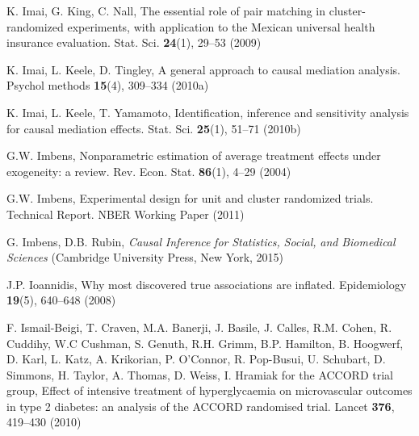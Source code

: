 \begin{list}{}{\setlength{\leftmargin}{2.1em}\setlength{\labelwidth}{0pt}
  \setlength{\labelsep}{0pt}\setlength{\itemindent}{-2.1em}
  \setlength{\parsep}{0pt}\setlength{\itemsep}{2pt}\setlength{\topsep}{0pt}}
\item\label{refentry:REF169}K. Imai, G. King, C. Nall, The essential role of pair matching in cluster-randomized experiments, with application to the Mexican universal health insurance evaluation. Stat. Sci. \textbf{24}(1), 29--53 (2009)\label{refend:REF169}
\item\label{refentry:REF170}K. Imai, L. Keele, D. Tingley, A general approach to causal mediation analysis. Psychol methods \textbf{15}(4), 309--334 (2010a)\label{refend:REF170}
\item\label{refentry:REF171}K. Imai, L. Keele, T. Yamamoto, Identification, inference and sensitivity analysis for causal mediation effects. Stat. Sci. \textbf{25}(1), 51--71 (2010b)\label{refend:REF171}
\item\label{refentry:REF172}G.W. Imbens, Nonparametric estimation of average treatment effects under exogeneity: a review. Rev. Econ. Stat. \textbf{86}(1), 4--29 (2004)\label{refend:REF172}
\item\label{refentry:REF173}G.W. Imbens, Experimental design for unit and cluster randomized trials. Technical Report. NBER Working Paper (2011)\label{refend:REF173}
\item\label{refentry:REF174}G. Imbens, D.B. Rubin, \textit{Causal} \textit{Inference} \textit{for} \textit{Statistics,} \textit{Social,} \textit{and} \textit{Biomedical} \textit{Sciences} (Cambridge University Press, New York, 2015)\label{refend:REF174}
\item\label{refentry:REF175}J.P. Ioannidis, Why most discovered true associations are inflated. Epidemiology \textbf{19}(5), 640--648 (2008)\label{refend:REF175}
\item\label{refentry:REF176}F. Ismail-Beigi, T. Craven, M.A. Banerji, J. Basile, J. Calles, R.M. Cohen, R. Cuddihy, W.C Cushman, S. Genuth, R.H. Grimm, B.P. Hamilton, B. Hoogwerf, D. Karl, L. Katz, A. Krikorian, P. O'Connor, R. Pop-Busui, U. Schubart, D. Simmons, H. Taylor, A. Thomas, D. Weiss, I. Hramiak for the ACCORD trial group, Effect of intensive treatment of hyperglycaemia on microvascular outcomes in type 2 diabetes: an analysis of the ACCORD randomised trial. Lancet \textbf{376}, 419--430 (2010)\label{refend:REF176}

\end{list}
